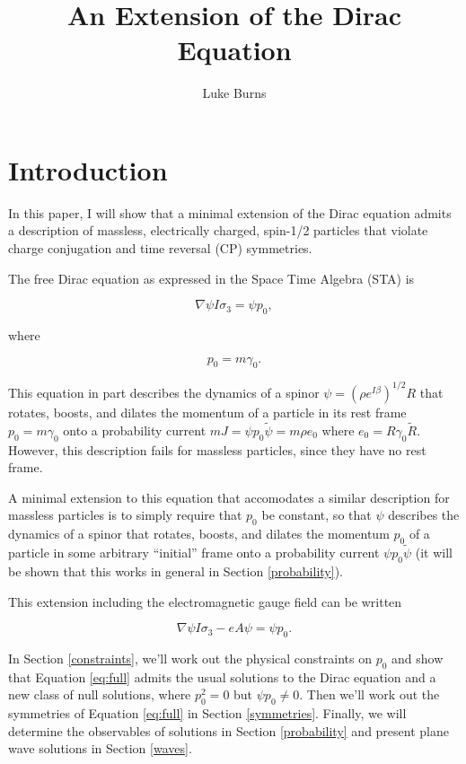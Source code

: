 \documentclass{article}
\title{An Extension of the Dirac Equation}
\author{Luke Burns}
\begin{document}
  \maketitle

  \section{Introduction}

  In this paper, I will show that a minimal extension of the Dirac equation admits a description of massless, electrically charged, spin-1/2 particles that violate charge conjugation and time reversal (CP) symmetries.

  The free Dirac equation as expressed in the Space Time Algebra (STA) is\cite{gap}

  \begin{equation}
    \nabla \psi I \sigma_3 = \psi p_0, \label{eq:dirac}
  \end{equation}

  where

  \begin{equation}
    p_0 = m \gamma_0. \label{eq:mass}
  \end{equation} 

  This equation in part describes the dynamics of a spinor $\psi = (\rho e^{I \beta})^{1/2}R$ that rotates, boosts, and dilates the momentum of a particle in its rest frame $p_0 = m \gamma_0$ onto a probability current $mJ = \psi p_0 \widetilde \psi = m \rho e_0$ where $e_0 = R \gamma_0 \widetilde R$. However, this description fails for massless particles, since they have no rest frame.

  A minimal extension to this equation that accomodates a similar description for massless particles is to simply require that $p_0$ be constant, so that $\psi$ describes the dynamics of a spinor that rotates, boosts, and dilates the momentum $p_0$ of a particle in some arbitrary ``initial'' frame onto a probability current $\psi p_0 \widetilde \psi$ (it will be shown that this works in general in Section \ref{probability}).

  This extension including the electromagnetic gauge field can be written

  \begin{equation}
    \nabla \psi I \sigma_3 - e A \psi = \psi p_0. \label{eq:full}
  \end{equation}

  In Section \ref{constraints}, we'll work out the physical constraints on $p_0$ and show that Equation \ref{eq:full} admits the usual solutions to the Dirac equation and a new class of null solutions, where $p_0^2 = 0$ but $\psi p_0 \not = 0$. Then we'll work out the symmetries of Equation \ref{eq:full} in Section \ref{symmetries}. Finally, we will determine the observables of solutions in Section \ref{probability} and present plane wave solutions in Section \ref{waves}. 
\end{document}
